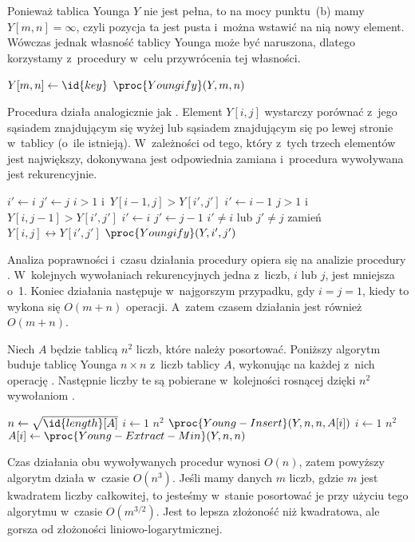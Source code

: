 \subproblem %
Ponieważ tablica Younga $Y$ nie jest pełna, to na mocy punktu~(b) mamy $Y[m,n]=\infty$, czyli pozycja ta jest pusta i~można wstawić na nią nowy element. Wówczas jednak własność tablicy Younga może być naruszona, dlatego korzystamy z~procedury  w~celu przywrócenia tej własności.
\begin{codebox}
\li	$Y[m,n]\gets\id{key}$
\li	$\proc{Youngify}(Y,m,n)$
\end{codebox}

Procedura  działa analogicznie jak . Element $Y[i,j]$ wystarczy porównać z~jego sąsiadem znajdującym się wyżej lub sąsiadem znajdującym się po lewej stronie w~tablicy (o~ile istnieją). W~zależności od tego, który z~tych trzech elementów jest największy, dokonywana jest odpowiednia zamiana i~procedura wywoływana jest rekurencyjnie.
\begin{codebox}
\li	$i'\gets i$
\li	$j'\gets j$
\li	\If $i>1$ i~$Y[i-1,j]>Y[i',j']$
\li		\Then $i'\gets i-1$
		\End
\li	\If $j>1$ i~$Y[i,j-1]>Y[i',j']$
\li		\Then
			$i'\gets i$
\li			$j'\gets j-1$
		\End
\li	\If $i'\ne i$ lub $j'\ne j$
\li		\Then
			zamień $Y[i,j]\leftrightarrow Y[i',j']$
\li			$\proc{Youngify}(Y,i',j')$
		\End
\end{codebox}

Analiza poprawności i~czasu działania procedury  opiera się na analizie procedury . W~kolejnych wywołaniach rekurencyjnych jedna z~liczb, $i$ lub $j$, jest mniejsza o~1. Koniec działania następuje w~najgorszym przypadku, gdy $i=j=1$, kiedy to wykona się $O(m+n)$ operacji. A~zatem czasem działania  jest również $O(m+n)$.

\subproblem %
Niech $A$ będzie tablicą $n^2$ liczb, które należy posortować. Poniższy algorytm buduje tablicę Younga $n\times n$ z~liczb tablicy $A$, wykonując na każdej z~nich operację . Następnie liczby te są pobierane w~kolejności rosnącej dzięki $n^2$ wywołaniom .
\begin{codebox}
\li	$n\gets\sqrt{\id{length}[A]}$
\li	\For $i\gets1$ \To $n^2$
\li		\Do $\proc{Young-Insert}(Y,n,n,A[i])$
		\End
\li	\For $i\gets1$ \To $n^2$
\li		\Do $A[i]\gets\proc{Young-Extract-Min}(Y,n,n)$
		\End
\end{codebox}

Czas działania obu wywoływanych procedur wynosi $O(n)$, zatem powyższy algorytm działa w~czasie $O(n^3)$. Jeśli mamy danych $m$ liczb, gdzie $m$ jest kwadratem liczby całkowitej, to jesteśmy w~stanie posortować je przy użyciu tego algorytmu w~czasie $O(m^{3/2})$. Jest to lepsza złożoność niż kwadratowa, ale gorsza od złożoności liniowo-logarytmicznej.


